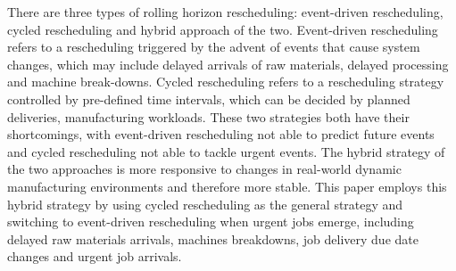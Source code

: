 There are three types of rolling horizon rescheduling: event-driven rescheduling, cycled rescheduling and hybrid approach of the two.
Event-driven rescheduling refers to a rescheduling triggered by the advent of events that cause system changes, which may include delayed arrivals of raw materials, delayed processing and machine break-downs.
Cycled rescheduling refers to a rescheduling strategy controlled by pre-defined time intervals, which can be decided by planned deliveries, manufacturing workloads.
These two strategies both have their shortcomings, with event-driven rescheduling not able to predict future events and cycled rescheduling not able to tackle urgent events\citep {jian19972}.
The hybrid strategy of the two approaches is more responsive to changes in real-world dynamic manufacturing environments and therefore more stable.
This paper employs this hybrid strategy by using cycled rescheduling as the general strategy and switching to event-driven rescheduling when urgent jobs emerge, including delayed raw materials arrivals, machines breakdowns, job delivery due date changes and urgent job arrivals.